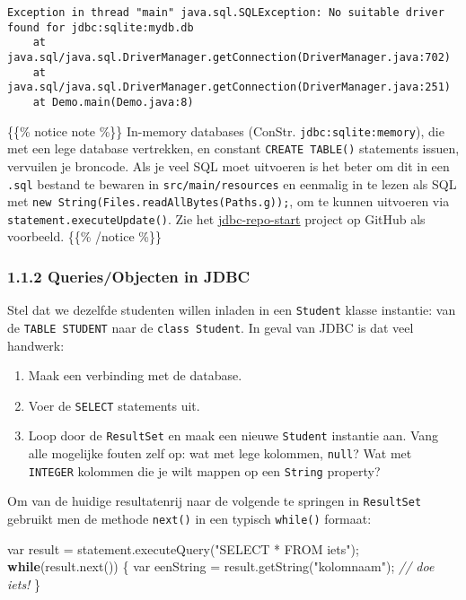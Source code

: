 \documentclass[
]{article}
\newenvironment{Shaded}{}{}
\newcommand{\CommentTok}[1]{\textcolor[rgb]{0.38,0.63,0.69}{\textit{#1}}}
\newcommand{\ControlFlowTok}[1]{\textcolor[rgb]{0.00,0.44,0.13}{\textbf{#1}}}
\newcommand{\DataTypeTok}[1]{\textcolor[rgb]{0.56,0.13,0.00}{#1}}
\newcommand{\FunctionTok}[1]{\textcolor[rgb]{0.02,0.16,0.49}{#1}}
\newcommand{\NormalTok}[1]{#1}
\newcommand{\OperatorTok}[1]{\textcolor[rgb]{0.40,0.40,0.40}{#1}}
\newcommand{\StringTok}[1]{\textcolor[rgb]{0.25,0.44,0.63}{#1}}
\providecommand{\tightlist}{%
  \setlength{\itemsep}{0pt}\setlength{\parskip}{0pt}}
\begin{document}
\begin{verbatim}
Exception in thread "main" java.sql.SQLException: No suitable driver found for jdbc:sqlite:mydb.db
    at java.sql/java.sql.DriverManager.getConnection(DriverManager.java:702)
    at java.sql/java.sql.DriverManager.getConnection(DriverManager.java:251)
    at Demo.main(Demo.java:8)
\end{verbatim}

\{\{\% notice note \%\}\} In-memory databases (ConStr.
\texttt{jdbc:sqlite:memory}), die met een lege database vertrekken, en
constant \texttt{CREATE\ TABLE()} statements issuen, vervuilen je
broncode. Als je veel SQL moet uitvoeren is het beter om dit in een
\texttt{.sql} bestand te bewaren in \texttt{src/main/resources} en
eenmalig in te lezen als SQL met
\texttt{new\ String(Files.readAllBytes(Paths.g));}, om te kunnen
uitvoeren via \texttt{statement.executeUpdate()}. Zie het
\href{https://github.com/KULeuven-Diepenbeek/db-course/tree/main/examples/java/jdbc-repo-start}{jdbc-repo-start}
project op GitHub als voorbeeld. \{\{\% /notice \%\}\}

\subsubsection{1.1.2 Queries/Objecten in
JDBC}\label{queriesobjecten-in-jdbc}

Stel dat we dezelfde studenten willen inladen in een \texttt{Student}
klasse instantie: van de \texttt{TABLE\ STUDENT} naar de
\texttt{class\ Student}. In geval van JDBC is dat veel handwerk:

\begin{enumerate}
\def\labelenumi{\arabic{enumi}.}
\tightlist
\item
  Maak een verbinding met de database.
\item
  Voer de \texttt{SELECT} statements uit.
\item
  Loop door de \texttt{ResultSet} en maak een nieuwe \texttt{Student}
  instantie aan. Vang alle mogelijke fouten zelf op: wat met lege
  kolommen, \texttt{null}? Wat met \texttt{INTEGER} kolommen die je wilt
  mappen op een \texttt{String} property?
\end{enumerate}

Om van de huidige resultatenrij naar de volgende te springen in
\texttt{ResultSet} gebruikt men de methode \texttt{next()} in een
typisch \texttt{while()} formaat:

\begin{Shaded}
\begin{Highlighting}[]
\DataTypeTok{var}\NormalTok{ result }\OperatorTok{=}\NormalTok{ statement}\OperatorTok{.}\FunctionTok{executeQuery}\OperatorTok{(}\StringTok{"SELECT * FROM iets"}\OperatorTok{);}
\ControlFlowTok{while}\OperatorTok{(}\NormalTok{result}\OperatorTok{.}\FunctionTok{next}\OperatorTok{())} \OperatorTok{\{}
    \DataTypeTok{var}\NormalTok{ eenString }\OperatorTok{=}\NormalTok{ result}\OperatorTok{.}\FunctionTok{getString}\OperatorTok{(}\StringTok{"kolomnaam"}\OperatorTok{);}
    \CommentTok{// doe iets!}
\OperatorTok{\}}
\end{Highlighting}
\end{Shaded}
\end{document}
